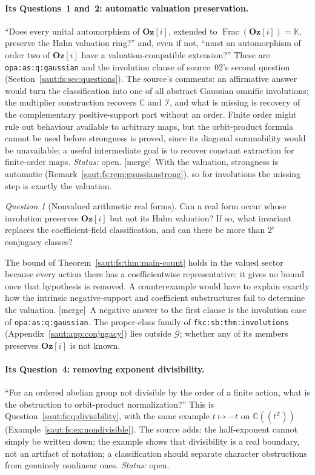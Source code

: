 \documentclass[11pt]{article}
\theoremstyle{definition}
\theoremstyle{remark}
\newtheorem{question}[theorem]{Question}
\newcommand{\C}{\mathbb C}
\newcommand{\Z}{\mathbb Z}
\newcommand{\K}{\mathbb K}
\newcommand{\lbl}[1]{\nolinkurl{#1}}%
\newcommand{\Oz}{\mathbf{Oz}}
\newcommand{\Frac}{\operatorname{Frac}}
\newcommand{\cc}{\mathfrak c}
\newcommand{\Ineg}{\mathcal I}
\newcommand{\mergetag}{\textup{[merge]}}
\numberwithin{equation}{section}
\begin{document}
\paragraph{Its Questions~1 and~2: automatic valuation preservation.}
``Does every unital automorphism of $\Oz[i]$, extended to $\Frac(\Oz[i])=\K$, preserve
the Hahn valuation ring?'' and, even if not, ``must an automorphism of order two of
$\Oz[i]$ have a valuation-compatible extension?'' These are \lbl{opa:as:q:gaussian} and
the involution clause of source~02's second question
(Section~\ref{saut:fs:sec:questions}). The source's comments: an affirmative answer
would turn the classification into one of all abstract Gaussian omnific involutions;
the multiplier construction recovers $\C$ and $\Ineg$, and what is missing is recovery
of the complementary positive-support part without an order. Finite order might rule
out behaviour available to arbitrary maps, but the orbit-product formula cannot be used
before strongness is proved, since its diagonal summability would be unavailable; a
useful intermediate goal is to recover constant extraction for finite-order maps.
\emph{Status:} open. \mergetag\ With the valuation, strongness is automatic
(Remark~\ref{saut:fs:rem:gaussianstrong}), so for involutions the missing step is
exactly the valuation.

\begin{question}[Nonvalued arithmetic real forms]\label{saut:gr:q:nonvalued}
Can a real form occur whose involution preserves $\Oz[i]$ but not its Hahn valuation? If
so, what invariant replaces the coefficient-field classification, and can there be more
than $2^{\cc}$ conjugacy classes?
\end{question}
The bound of Theorem~\ref{saut:fs:thm:main-count} holds in the valued sector because every
action there has a coefficientwise representative; it gives no bound once that
hypothesis is removed. A counterexample would have to explain exactly how the intrinsic
negative-support and coefficient substructures fail to determine the valuation.
\mergetag\ A negative answer to the first clause is the involution case of
\lbl{opa:as:q:gaussian}. The proper-class family of \lbl{fkc:sb:thm:involutions}
(Appendix~\ref{saut:app:conjugacy}) lies outside $\mathcal G$; whether any of its members
preserves $\Oz[i]$ is not known.

\paragraph{Its Question~4: removing exponent divisibility.} ``For an ordered abelian
group not divisible by the order of a finite action, what is the obstruction to
orbit-product normalization?'' This is Question~\ref{saut:fs:q:divisibility}, with the
same example $t\mapsto-t$ on $\C((t^\Z))$ (Example~\ref{saut:fs:ex:nondivisible}). The
source adds: the half-exponent cannot simply be written down; the example shows that
divisibility is a real boundary, not an artifact of notation; a classification should
separate character obstructions from genuinely nonlinear ones. \emph{Status:} open.
\end{document}
